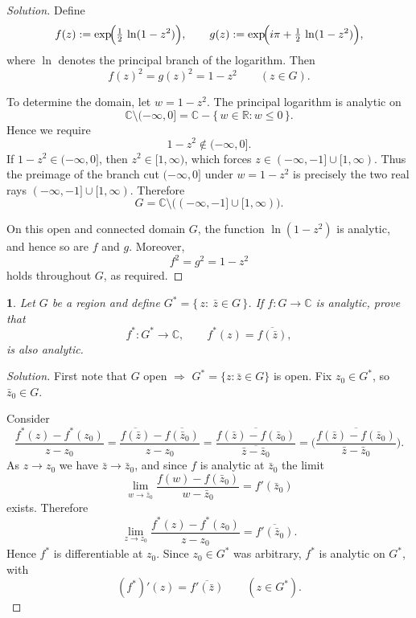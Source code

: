 \documentclass[12pt, a4paper]{report}
\theoremstyle{spaced}
\newtheorem{exercise}{}
\newcommand{\setexercise}[1]{\setcounter{exercise}{#1-1}}
\begin{document}
\begin{proof}[Solution]
	Define
	\[
		f(z):= \exp\!\Bigl(\tfrac12\,\ln(1-z^2)\Bigr),
		\qquad
		g(z):= \exp\!\Bigl(i\pi + \tfrac12\,\ln(1-z^2)\Bigr),
	\]
	where \(\ln\) denotes the principal branch of the logarithm.
	Then
	\[
		f(z)^2 = g(z)^2 = 1 - z^2\qquad (z\in G).
	\]

	To determine the domain, let \(w = 1 - z^2\).
	The principal logarithm is analytic on
	\[
		\mathbb{C}\setminus(-\infty,0]
		= \mathbb{C} - \{\,w\in\mathbb{R} : w\le 0\,\}.
	\]
	Hence we require
	\[
		1 - z^2 \notin (-\infty,0].
	\]
	If \(1 - z^2 \in (-\infty,0]\), then \(z^2 \in [1,\infty)\), which forces
	\(z\in(-\infty,-1]\cup[1,\infty)\).
	Thus the preimage of the branch cut \((-\infty,0]\) under \(w = 1 - z^2\)
	is precisely the two real rays \((-\infty,-1]\cup[1,\infty)\).
		Therefore
		\[
		G = \mathbb{C}\setminus\bigl((-\infty,-1]\cup[1,\infty)\bigr).
	\]

	On this open and connected domain \(G\), the function \(\ln(1-z^2)\) is analytic,
	and hence so are \(f\) and \(g\).  Moreover,
	\[
		f^2 = g^2 = 1 - z^2
	\]
	holds throughout \(G\), as required.
\end{proof}

\setexercise{19}
\begin{exercise}
	Let \(G\) be a region and define \(G^*=\{\,z:\ \bar z\in G\,\}\). If \(f:G\to\mathbb{C}\) is analytic, prove that
	\[
		f^*:G^*\to\mathbb{C},\qquad f^*(z)=\overline{f(\bar z)},
	\]
	is also analytic.
\end{exercise}

\begin{proof}[Solution]
	First note that $G$ open $\Rightarrow$ $G^*=\{z:\bar z\in G\}$ is open. Fix $z_0\in G^*$, so $\bar z_0\in G$.

	Consider
	\[
		\frac{f^*(z)-f^*(z_0)}{z-z_0}
		=\frac{\overline{f(\bar z)}-\overline{f(\bar z_0)}}{z-z_0}
		=\overline{\frac{f(\bar z)-f(\bar z_0)}{\overline{\bar z-\bar z_0}}}
		=\overline{\Big(\frac{f(\bar z)-f(\bar z_0)}{\bar z-\bar z_0}\Big)}.
	\]
	As $z\to z_0$ we have $\bar z\to \bar z_0$, and since $f$ is analytic at $\bar z_0$ the limit
	\[
		\lim_{w\to \bar z_0}\frac{f(w)-f(\bar z_0)}{w-\bar z_0}=f'(\bar z_0)
	\]
	exists. Therefore
	\[
		\lim_{z\to z_0}\frac{f^*(z)-f^*(z_0)}{z-z_0}
		=\overline{f'(\bar z_0)}.
	\]
	Hence $f^*$ is differentiable at $z_0$. Since $z_0\in G^*$ was arbitrary, $f^*$ is analytic on $G^*$, with
	\[
		(f^*)'(z)=\overline{f'(\bar z)}\qquad(z\in G^*).
	\]
\end{proof}
\end{document}
